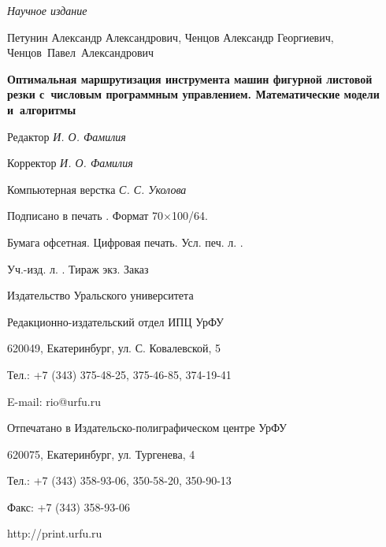 
\makeatletter
\newcommand*{\cleartoleftpage}{%
  \clearpage
    \if@twoside
    \ifodd\c@page
      \hbox{}\thispagestyle{empty}\newpage
      \if@twocolumn
        \hbox{}\newpage
      \fi
    \fi
  \fi
}
\makeatother
\cleartoleftpage

\thispagestyle{empty}
\centering

\vspace{0pt plus2fill}
{\small\it
Научное издание
}

\vspace{0pt plus2fill}

Петунин Александр Александрович,
Ченцов Александр Георгиевич,
Ченцов~Павел~Александрович

\vspace{0pt plus1fill}

{\bf
Оптимальная маршрутизация инструмента машин фигурной
листовой резки с~числовым
программным управлением.
Математические модели и~алгоритмы
}

\vspace{0pt plus2fill}

Редактор {\it
И. О. Фамилия
}

Корректор {\it
И. О. Фамилия
}

Компьютерная верстка {\it
С. С. Уколова
}

\vspace{0pt plus1fill}

{\small
Подписано в печать \underline{\hspace{1cm}}.
Формат 70$\times$100/64.

Бумага офсетная.
Цифровая печать.
Усл. печ. л. \underline{\hspace{1cm}}.

Уч.-изд. л. \underline{\hspace{1cm}}.
Тираж \underline{\hspace{1cm}} экз.
Заказ \underline{\hspace{1cm}}

\vspace{0pt plus1fill}

Издательство Уральского университета

Редакционно-издательский отдел ИПЦ УрФУ

620049, Екатеринбург, ул. С. Ковалевской, 5

Тел.: +7 (343) 375-48-25, 375-46-85, 374-19-41

E-mail: rio@urfu.ru

\vspace{0pt plus1fill}

Отпечатано в Издательско-полиграфическом центре УрФУ

620075, Екатеринбург, ул. Тургенева, 4

Тел.: +7 (343) 358-93-06, 350-58-20, 350-90-13

Факс: +7 (343) 358-93-06

http://print.urfu.ru
}

\vspace{0pt plus1fill}
